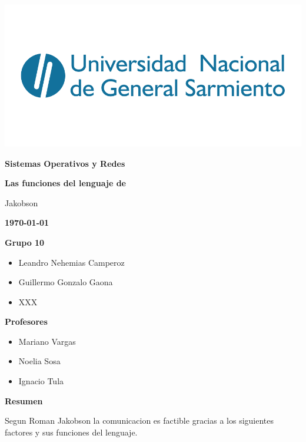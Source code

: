 \documentclass[a4paper,12pt,titlepage]{article} %
\newcommand{\titulo}{Las funciones del lenguaje de\par Jakobson}
\newcommand{\Autor}{Grupo 10}
\begin{document}
\begin{titlepage}
  \begin{center}
   \includegraphics[width=1.0\textwidth]{./Imagenes/logo_ungs.png}\par\vspace{0.1cm}
                  {\LARGE \bfseries Sistemas Operativos y Redes}\par\vspace{0.5cm}
                  {\huge \bfseries\textcolor{colorUngs}\titulo}\par\vspace{0.2cm}
                  {\large \bfseries \today}  
  \end{center}

\vspace{2.5cm}

  \bfseries{{\large \Autor}}
  \small\begin{itemize}
    \item Leandro Nehemias Camperoz
    \item Guillermo Gonzalo Gaona
    \item XXX
  \end{itemize}
  
  \vspace{1.5cm}

  \bfseries{\large Profesores}
  \small\begin{itemize}
    \item Mariano Vargas
    \item Noelia Sosa
    \item Ignacio Tula
  \end{itemize}
\end{titlepage}

{\Large \textbf{Resumen}}\newline

Segun Roman Jakobson la comunicacion es factible gracias a los siguientes factores y sus funciones del lenguaje.\newline
\end{document}
